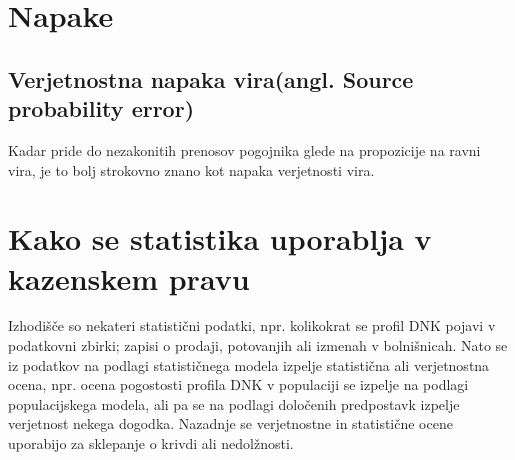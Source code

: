 \documentclass[12pt,a4paper]{amsart}
\theoremstyle{definition} %
\theoremstyle{plain} %
\begin{document}
\section{Napake}
\subsection{Verjetnostna napaka vira(angl. Source probability error)}
Kadar pride do nezakonitih prenosov pogojnika glede na propozicije na ravni vira, je to bolj strokovno znano kot napaka verjetnosti vira.
\section{Kako se statistika uporablja v kazenskem pravu}
Izhodišče so nekateri statistični podatki, npr. kolikokrat se profil DNK pojavi v podatkovni zbirki; zapisi o prodaji, potovanjih ali izmenah v bolnišnicah. Nato se iz podatkov na podlagi statističnega modela izpelje statistična ali verjetnostna ocena, 
npr. ocena pogostosti profila DNK v populaciji se izpelje na podlagi populacijskega modela, ali pa se na podlagi določenih predpostavk izpelje verjetnost nekega dogodka. Nazadnje se verjetnostne in statistične ocene uporabijo za sklepanje o krivdi 
ali nedolžnosti.
\end{document}
